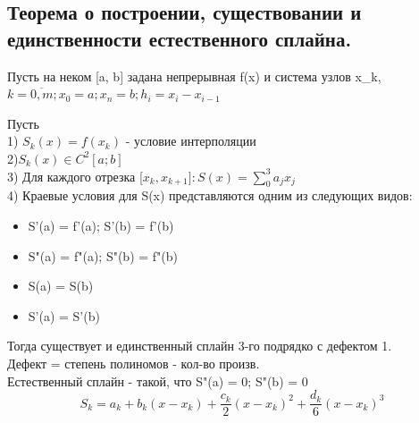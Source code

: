 \documentclass[a4paper,12pt]{article}
\begin{document}
\subsection{Теорема о построении, существовании и единственности естественного сплайна.}
Пусть на неком [a, b] задана непрерывная f(x) и система узлов {x_k}, $k =\overline{0, m}; x_0 = a; x_n = b; h_i = x_i - x_{i-1}$

Пусть\\
1) $S_k(x) = f(x_k)$ - условие интерполяции\\
2)$S_k(x) \in C^2[a;b]$\\
3) Для каждого отрезка [$x_k, x_{k+1}] : S(x) = \sum_0^3 a_j x_j$\\
4) Краевые условия для S(x) представляются одним из следующих видов:\\
\begin{itemize}
    \item S'(a) = f'(a); S'(b) = f'(b)
    \item S"(a) = f"(a); S"(b) = f"(b)
    \item S(a) = S(b)
    \item S'(a) = S'(b)
\end{itemize}
Тогда существует и единственный сплайн 3-го подрядко с дефектом 1.\\

Дефект = степень полиномов - кол-во произв.\\
Естественный сплайн - такой, что S"(a) = 0; S"(b) = 0\\

\[S_k = a_k + b_k(x-x_k) + \frac{c_k}{2}(x-x_k)^2 + \frac{d_k}{6}(x-x_k)^3\]
\end{document}
